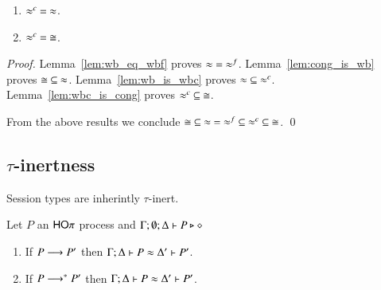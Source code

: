 
\begin{theorem}[Concidence]
	\begin{enumerate}
		\item	$\approx^{c}\ =\ \approx$.
		\item	$\approx^{c}\ =\ \cong$.
	\end{enumerate}
\end{theorem}

\begin{proof}
	\noi	Lemma~\ref{lem:wb_eq_wbf} proves $\approx\ =\ \approx^{f}$.
		Lemma~\ref{lem:cong_is_wb} proves $\cong\ \subseteq\ \approx$.
		Lemma~\ref{lem:wb_is_wbc} proves $\approx\ \subseteq\ \approx^{c}$.
		Lemma~\ref{lem:wbc_is_cong} proves $\approx^{c}\ \subseteq\ \cong$.

	\noi From the above results we conclude $\cong\ \subseteq\ \wb\ =\ \wbf\ \subseteq\ \wbc\ \subseteq\ \cong$. 
	\qed
\end{proof}


\subsection{$\tau$-inertness}
\label{app:sub_tau_inert}

Session types are inherintly $\tau$-inert.

\begin{lemma}\rm
	\label{lem:tau_inert}
	Let $P$ an $\mathsf{HO}\pi$ process
	and $\Gamma; \emptyset; \Delta \vdash P \triangleright \diamond$
	\begin{enumerate}
		\item	If $P \longrightarrow P'$ then $\Gamma; \Delta \vdash P \approx \Delta' \vdash P'$.
		\item	If $P \longrightarrow^* P'$ then $\Gamma; \Delta \vdash P \approx \Delta' \vdash P'$.
	\end{enumerate}
\end{lemma}

